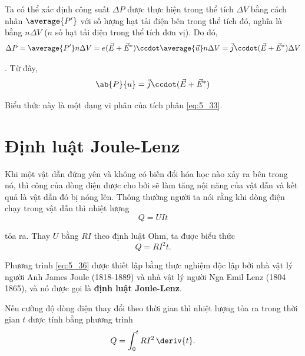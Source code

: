 Ta có thể xác định công suất $\Delta{P}$ được thực hiện trong thể tích $\Delta{V}$ bằng cách nhân $\average{P'}$ với số lượng hạt tải điện bên trong thể tích đó, nghĩa là bằng $n\Delta{V}$ ($n$ số hạt tải điện trong thể tích đơn vị). Do đó,
\begin{equation*}
    \Delta{P} = \average{P'} n \Delta{V} = e (\vec{E} + \vec{E}^*) \ccdot \average{\vec{u}} n \Delta{V} = \vec{j} \ccdot (\vec{E} + \vec{E}^*) \Delta{V}
\end{equation*}

. Từ đây,
\begin{equation}\label{eq:5_35}
    \ab{P}{u} = \vec{j} \ccdot (\vec{E} + \vec{E}^*)
\end{equation}

\noindent
Biểu thức này là một dạng vi phân của tích phân \eqref{eq:5_33}.

\section{Định luật Joule-Lenz}\label{sec:5_8}

Khi một vật dẫn đứng yên và không có biến đổi hóa học nào xảy ra bên trong nó, thì công của dòng điện được cho bởi  sẽ làm tăng nội năng của vật dẫn và kết quả là vật dẫn đó bị nóng lên. Thông thường người ta nói rằng khi dòng điện chạy trong vật dẫn thì nhiệt lượng
\begin{equation*}
    Q = U I t
\end{equation*}

\noindent
tỏa ra. Thay $U$ bằng $RI$ theo định luật Ohm, ta được biểu thức
\begin{equation}\label{eq:5_36}
    Q = R I^2 t.
\end{equation}

Phương trình \eqref{eq:5_36} được thiết lập bằng thực nghiệm độc lập bởi nhà vật lý người Anh James Joule (1818-1889) và nhà vật lý người Nga Emil Lenz (1804 1865), và nó được gọi là \textbf{định luật Joule-Lenz}.

Nếu cường độ dòng điện thay đổi theo thời gian thì nhiệt lượng tỏa ra trong thời gian $t$ được tính bằng phương trình
\begin{equation}\label{eq:5_37}
    Q = \int_0^t R I^2\, \deriv{t}.
\end{equation}


